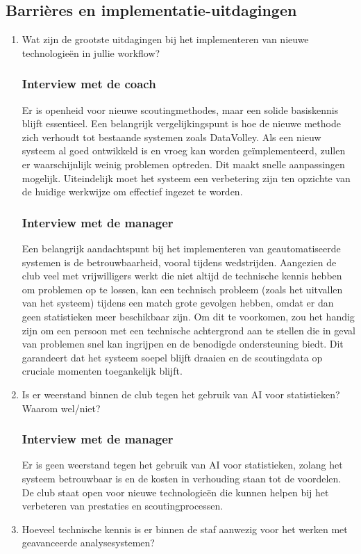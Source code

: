 \subsection{Barrières en implementatie-uitdagingen}
\begin{enumerate}
  \item Wat zijn de grootste uitdagingen bij het implementeren van nieuwe technologieën in jullie workflow?
  \subsubsection{Interview met de coach}
  Er is openheid voor nieuwe scoutingmethodes, maar een solide basiskennis blijft essentieel. Een belangrijk vergelijkingspunt is hoe de nieuwe methode zich verhoudt tot bestaande systemen zoals DataVolley. Als een nieuw systeem al goed ontwikkeld is en vroeg kan worden geïmplementeerd, zullen er waarschijnlijk weinig problemen optreden. Dit maakt snelle aanpassingen mogelijk. Uiteindelijk moet het systeem een verbetering zijn ten opzichte van de huidige werkwijze om effectief ingezet te worden.
  \subsubsection{Interview met de manager}
  Een belangrijk aandachtspunt bij het implementeren van geautomatiseerde systemen is de betrouwbaarheid, vooral tijdens wedstrijden. Aangezien de club veel met vrijwilligers werkt die niet altijd de technische kennis hebben om problemen op te lossen, kan een technisch probleem (zoals het uitvallen van het systeem) tijdens een match grote gevolgen hebben, omdat er dan geen statistieken meer beschikbaar zijn. Om dit te voorkomen, zou het handig zijn om een persoon met een technische achtergrond aan te stellen die in geval van problemen snel kan ingrijpen en de benodigde ondersteuning biedt. Dit garandeert dat het systeem soepel blijft draaien en de scoutingdata op cruciale momenten toegankelijk blijft.
  \item Is er weerstand binnen de club tegen het gebruik van AI voor statistieken? Waarom wel/niet?
  \subsubsection{Interview met de manager}
  Er is geen weerstand tegen het gebruik van AI voor statistieken, zolang het systeem betrouwbaar is en de kosten in verhouding staan tot de voordelen. De club staat open voor nieuwe technologieën die kunnen helpen bij het verbeteren van prestaties en scoutingprocessen.
  \item Hoeveel technische kennis is er binnen de staf aanwezig voor het werken met geavanceerde analysesystemen?

\end{enumerate}

